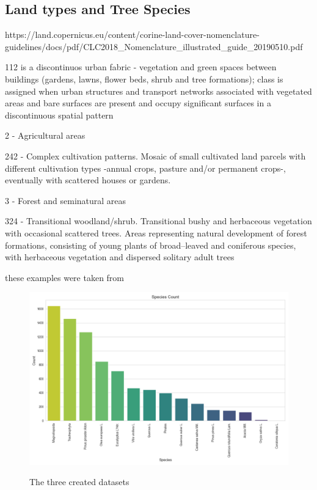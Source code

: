 \subsection{Land types and Tree Species}





\cite{71c95a07-e296-44fc-b22b-415f42acfdf0}

https://land.copernicus.eu/content/corine-land-cover-nomenclature-guidelines/docs/pdf/CLC2018_Nomenclature_illustrated_guide_20190510.pdf



112 is a discontinuos urban fabric - vegetation and green spaces between buildings (gardens, lawns, flower beds, shrub and tree formations); class is assigned when urban structures and transport networks associated with vegetated areas and bare surfaces are present and occupy significant surfaces in a discontinuous spatial pattern

2 - Agricultural areas 

242 - Complex cultivation patterns. Mosaic of small cultivated land parcels with different cultivation types -annual crops, pasture and/or permanent crops-, eventually with scattered houses or gardens.

3 - Forest and seminatural areas 

324 - Transitional woodland/shrub. Transitional bushy and herbaceous vegetation with occasional scattered trees. Areas representing natural development of forest formations, consisting of young plants of broad–leaved and coniferous species, with herbaceous vegetation and dispersed solitary adult trees


these examples were taken from 

\begin{figure}[H]
	\caption{The three created datasets}
	\centering
	\includegraphics[width=\textwidth]{chapter-images/5_1-eda/species_count.png}
	\label{fig:species_count}
\end{figure}


